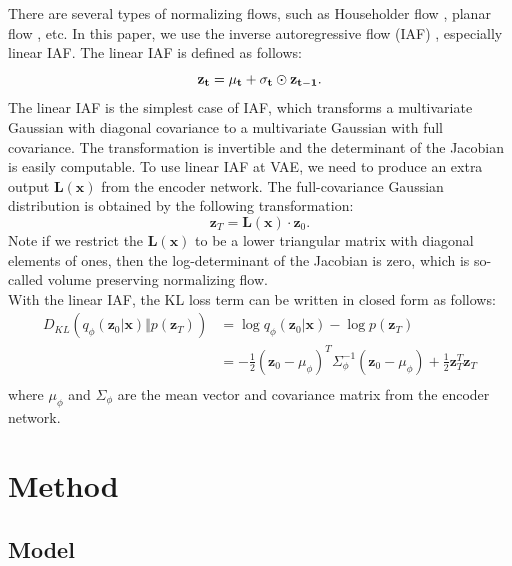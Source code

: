 \documentclass[10pt]{article}
\begin{document}
There are several types of normalizing flows, such as Householder flow \cite{tomczak2017householder}, planar flow \cite{rezende15normalizingflows}, etc. In this paper, we use the inverse autoregressive flow (IAF) \cite{kingma2016iaf}, especially linear IAF. The linear IAF is defined as follows:
\begin{equation}
    \bf z_t = \bf \mu_t + \bf \sigma_t \odot \bf z_{t-1}.
\end{equation}
The linear IAF is the simplest case of IAF, which transforms a multivariate Gaussian with diagonal covariance to a multivariate Gaussian with full covariance. The transformation is invertible and the determinant of the Jacobian is easily computable. To use linear IAF at VAE, we need to produce an extra output $\mathbf{L(x)}$ from the encoder network. The full-covariance Gaussian distribution is obtained by the following transformation:
\begin{equation}
    \mathbf{z}_T = \mathbf{L(x)} \cdot \mathbf{z}_0.
\end{equation}
Note if we restrict the $\mathbf{L(x)}$ to be a lower triangular matrix with diagonal elements of ones, then the log-determinant of the Jacobian is zero, which is so-called volume preserving normalizing flow. \cite{kingma2016iaf}\\

With the linear IAF, the KL loss term can be written in closed form as follows:
\begin{equation}
    \begin{aligned}
        D_{KL}(q_\phi(\mathbf{z}_0 | \mathbf{x}) \Vert p(\mathbf{z}_T)) &=
        \log q_\phi(\mathbf{z}_0 | \mathbf{x}) - \log p(\mathbf{z}_T) \\
        &= -\frac{1}{2}(\mathbf{z}_0 -\mu_\phi)^T\Sigma_\phi^{-1}(\mathbf{z}_0 -\mu_\phi) + \frac{1}{2}\mathbf{z}_T^T\mathbf{z}_T \\
    \end{aligned}
\end{equation}
where $\mu_\phi$ and $\Sigma_\phi$ are the mean vector and covariance matrix from the encoder network.\\


\section{Method}

\subsection{Model}
\end{document}
